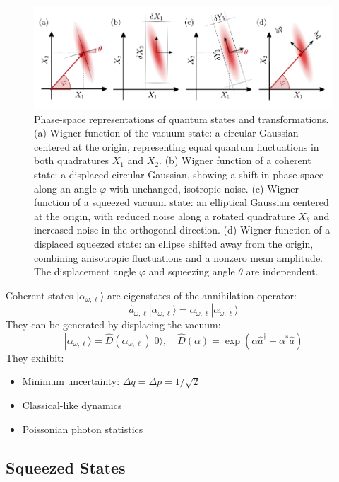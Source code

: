 \begin{figure}
\centering
\includegraphics[width=\textwidth]{./chap2/fig/quadratures_phasespace.pdf}
\caption{Phase-space representations of quantum states and transformations.
(a) Wigner function of the vacuum state: a circular Gaussian centered at the origin, representing equal quantum fluctuations in both quadratures $X_1$ and $X_2$.
(b) Wigner function of a coherent state: a displaced circular Gaussian, showing a shift in phase space along an angle $\varphi$ with unchanged, isotropic noise.
(c) Wigner function of a squeezed vacuum state: an elliptical Gaussian centered at the origin, with reduced noise along a rotated quadrature $X_\theta$ and increased noise in the orthogonal direction.
(d) Wigner function of a displaced squeezed state: an ellipse shifted away from the origin, combining anisotropic fluctuations and a nonzero mean amplitude. The displacement angle $\varphi$ and squeezing angle $\theta$ are independent.} 
\end{figure}


Coherent states $|\alpha_{\omega,\ell}\rangle$ are eigenstates of the annihilation operator:
\begin{equation}
\hat{a}_{\omega,\ell}|\alpha_{\omega,\ell}\rangle = \alpha_{\omega,\ell}|\alpha_{\omega,\ell}\rangle
\end{equation}
They can be generated by displacing the vacuum:
\begin{equation}
|\alpha_{\omega,\ell}\rangle = \hat{D}(\alpha_{\omega,\ell})|0\rangle, \quad \hat{D}(\alpha) = \exp(\alpha \hat{a}^\dagger - \alpha^* \hat{a})
\end{equation}
They exhibit:
\begin{itemize}
  \item Minimum uncertainty: $\Delta q = \Delta p = 1/\sqrt{2}$
  \item Classical-like dynamics
  \item Poissonian photon statistics
\end{itemize}

\subsection*{Squeezed States}


